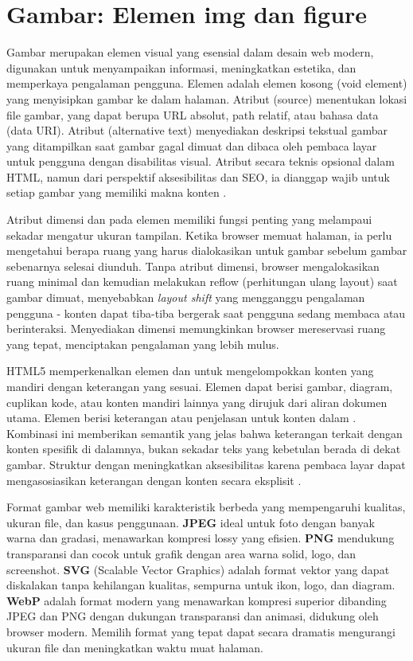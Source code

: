 \section{Gambar: Elemen img dan figure}

Gambar merupakan elemen visual yang esensial dalam desain web modern, digunakan untuk menyampaikan informasi, meningkatkan estetika, dan memperkaya pengalaman pengguna. Elemen  adalah elemen kosong (void element) yang menyisipkan gambar ke dalam halaman. Atribut  (source) menentukan lokasi file gambar, yang dapat berupa URL absolut, path relatif, atau bahasa data (data URI). Atribut  (alternative text) menyediakan deskripsi tekstual gambar yang ditampilkan saat gambar gagal dimuat dan dibaca oleh pembaca layar untuk pengguna dengan disabilitas visual. Atribut  secara teknis opsional dalam HTML, namun dari perspektif aksesibilitas dan SEO, ia dianggap wajib untuk setiap gambar yang memiliki makna konten \cite{mdnAccessibility}.

Atribut dimensi  dan  pada elemen  memiliki fungsi penting yang melampaui sekadar mengatur ukuran tampilan. Ketika browser memuat halaman, ia perlu mengetahui berapa ruang yang harus dialokasikan untuk gambar sebelum gambar sebenarnya selesai diunduh. Tanpa atribut dimensi, browser mengalokasikan ruang minimal dan kemudian melakukan reflow (perhitungan ulang layout) saat gambar dimuat, menyebabkan \textit{layout shift} yang mengganggu pengalaman pengguna - konten dapat tiba-tiba bergerak saat pengguna sedang membaca atau berinteraksi. Menyediakan dimensi memungkinkan browser mereservasi ruang yang tepat, menciptakan pengalaman yang lebih mulus.

HTML5 memperkenalkan elemen  dan  untuk mengelompokkan konten yang mandiri dengan keterangan yang sesuai. Elemen  dapat berisi gambar, diagram, cuplikan kode, atau konten mandiri lainnya yang dirujuk dari aliran dokumen utama. Elemen  berisi keterangan atau penjelasan untuk konten dalam . Kombinasi ini memberikan semantik yang jelas bahwa keterangan terkait dengan konten spesifik di dalamnya, bukan sekadar teks yang kebetulan berada di dekat gambar. Struktur  dengan  meningkatkan aksesibilitas karena pembaca layar dapat mengasosiasikan keterangan dengan konten secara eksplisit \cite{webdevAccessibility}.

Format gambar web memiliki karakteristik berbeda yang mempengaruhi kualitas, ukuran file, dan kasus penggunaan. \textbf{JPEG} ideal untuk foto dengan banyak warna dan gradasi, menawarkan kompresi lossy yang efisien. \textbf{PNG} mendukung transparansi dan cocok untuk grafik dengan area warna solid, logo, dan screenshot. \textbf{SVG} (Scalable Vector Graphics) adalah format vektor yang dapat diskalakan tanpa kehilangan kualitas, sempurna untuk ikon, logo, dan diagram. \textbf{WebP} adalah format modern yang menawarkan kompresi superior dibanding JPEG dan PNG dengan dukungan transparansi dan animasi, didukung oleh browser modern. Memilih format yang tepat dapat secara dramatis mengurangi ukuran file dan meningkatkan waktu muat halaman.

